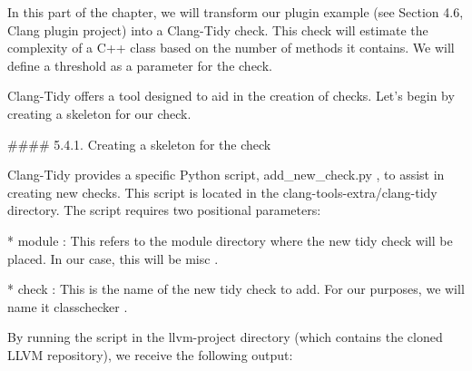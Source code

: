 
\begin{markdown}
In this part of the chapter, we will transform our plugin example (see Section 4.6, Clang plugin project) into a Clang-Tidy check. This check will estimate the complexity of a C++ class based on the number of methods it contains. We will define a threshold as a parameter for the check.

Clang-Tidy offers a tool designed to aid in the creation of checks. Let's begin by creating a skeleton for our check.

#### 5.4.1. Creating a skeleton for the check

Clang-Tidy provides a specific Python script, add_new_check.py , to assist in creating new checks. This script is located in the clang-tools-extra/clang-tidy directory. The script requires two positional parameters:

* module : This refers to the module directory where the new tidy check will be placed. In our case, this will be misc .

* check : This is the name of the new tidy check to add. For our purposes, we will name it classchecker .

By running the script in the llvm-project directory (which contains the cloned LLVM repository), we receive the following output:

\end{markdown}


